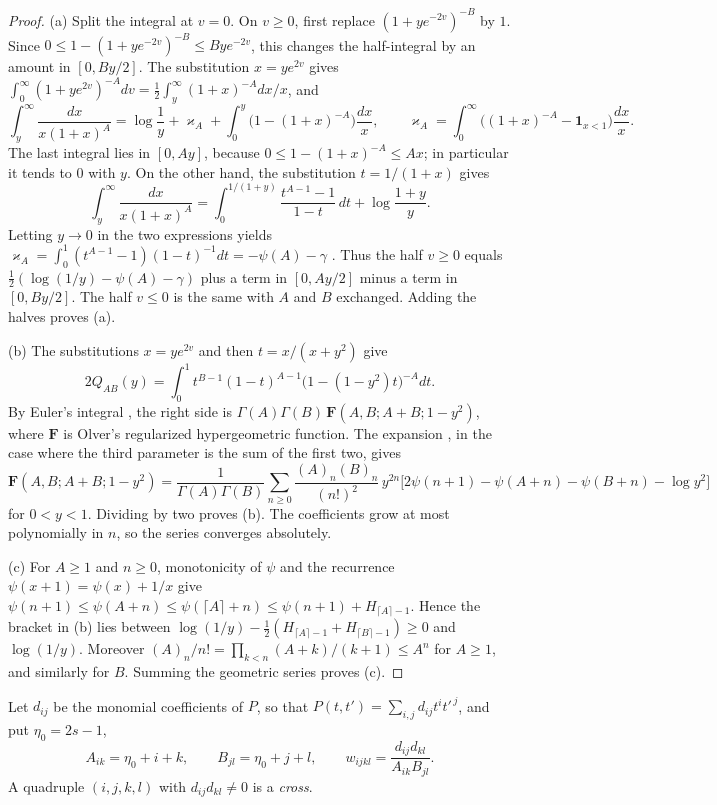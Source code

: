 \begin{proof}
(a) Split the integral at $v=0$. On $v\ge0$, first replace
$(1+ye^{-2v})^{-B}$ by $1$. Since
$0\le1-(1+ye^{-2v})^{-B}\le Bye^{-2v}$, this changes the half-integral
by an amount in $[0,By/2]$. The substitution $x=ye^{2v}$ gives
$\int_0^\infty(1+ye^{2v})^{-A}dv=\frac12\int_y^\infty(1+x)^{-A}dx/x$,
and
\[
 \int_y^\infty\frac{dx}{x(1+x)^A}
 =\log\frac1y+\varkappa_A+\int_0^y\bigl(1-(1+x)^{-A}\bigr)\frac{dx}x,\qquad
 \varkappa_A=\int_0^\infty\bigl((1+x)^{-A}-\mathbf 1_{x<1}\bigr)\frac{dx}x .
\]
The last integral lies in $[0,Ay]$, because $0\le1-(1+x)^{-A}\le Ax$;
in particular it tends to $0$ with $y$. On the other hand, the
substitution $t=1/(1+x)$ gives
\[
 \int_y^\infty\frac{dx}{x(1+x)^A}
 =\int_0^{1/(1+y)}\frac{t^{A-1}-1}{1-t}\,dt+\log\frac{1+y}y .
\]
Letting $y\to0$ in the two expressions yields
$\varkappa_A=\int_0^1(t^{A-1}-1)(1-t)^{-1}dt=-\psi(A)-\gamma$
\cite[Equation~(5.9.16)]{DLMF}. Thus the half $v\ge0$ equals
$\frac12(\log(1/y)-\psi(A)-\gamma)$ plus a term in $[0,Ay/2]$ minus a
term in $[0,By/2]$. The half $v\le0$ is the same with $A$ and $B$
exchanged. Adding the halves proves (a).

(b) The substitutions $x=ye^{2v}$ and then $t=x/(x+y^2)$ give
\[
 2Q_{AB}(y)=\int_0^1t^{B-1}(1-t)^{A-1}\bigl(1-(1-y^2)t\bigr)^{-A}dt .
\]
By Euler's integral \cite[Equation~(15.6.1)]{DLMF}, the right side is
$\Gamma(A)\Gamma(B)\,\mathbf F(A,B;A+B;1-y^2)$, where $\mathbf F$ is
Olver's regularized hypergeometric function. The expansion
\cite[Equation~(15.8.10)]{DLMF}, in the case where the third parameter
is the sum of the first two, gives
\[
 \mathbf F(A,B;A+B;1-y^2)=\frac1{\Gamma(A)\Gamma(B)}\sum_{n\ge0}
 \frac{(A)_n(B)_n}{(n!)^2}\,y^{2n}\bigl[2\psi(n+1)-\psi(A+n)-\psi(B+n)
 -\log y^2\bigr]
\]
for $0<y<1$. Dividing by two proves (b). The coefficients grow at most
polynomially in $n$, so the series converges absolutely.

(c) For $A\ge1$ and $n\ge0$, monotonicity of $\psi$ and the recurrence
$\psi(x+1)=\psi(x)+1/x$ give
$\psi(n+1)\le\psi(A+n)\le\psi(\lceil A\rceil+n)\le\psi(n+1)+H_{\lceil
A\rceil-1}$. Hence the bracket in (b) lies between
$\log(1/y)-\frac12(H_{\lceil A\rceil-1}+H_{\lceil B\rceil-1})\ge0$ and
$\log(1/y)$. Moreover $(A)_n/n!=\prod_{k<n}(A+k)/(k+1)\le A^n$ for
$A\ge1$, and similarly for $B$. Summing the geometric series proves
(c).
\end{proof}

\begin{definition}\label{pf:cross}
Let $d_{ij}$ be the monomial coefficients of $P$, so that
$P(t,t')=\sum_{i,j}d_{ij}t^it'^{\,j}$, and put $\eta_0=2s-1$,
\[
 A_{ik}=\eta_0+i+k,\qquad B_{jl}=\eta_0+j+l,\qquad
 w_{ijkl}=\frac{d_{ij}d_{kl}}{A_{ik}B_{jl}} .
\]
A quadruple $(i,j,k,l)$ with $d_{ij}d_{kl}\ne0$ is a \emph{cross}.
\end{definition}


